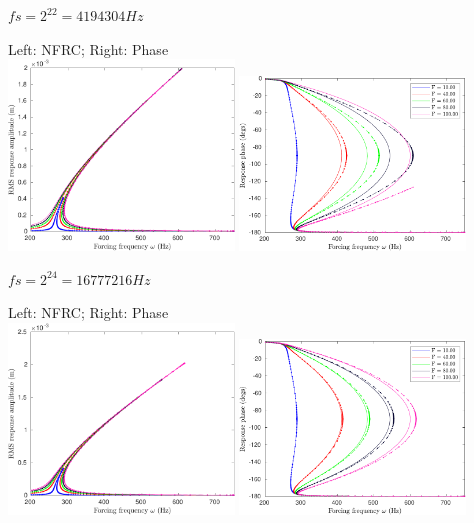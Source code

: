 \documentclass[9pt]{beamer}
\begin{document}
\begin{frame}{$fs=2^{22}=4194304 Hz$}
 \begin{center}
    Left: NFRC; Right: Phase\\
    \includegraphics[width=0.45\textwidth]{fig/nfrc/dssex_frf_Amp_fs4194304}
    \includegraphics[width=0.45\textwidth]{fig/nfrc/dssex_frf_Phase_fs4194304}
  \end{center}
\end{frame}


\begin{frame}{$fs=2^{24}=16777216 Hz$}
 \begin{center}
    Left: NFRC; Right: Phase\\
    \includegraphics[width=0.45\textwidth]{fig/nfrc/dssex_frf_Amp_fs16777216}
    \includegraphics[width=0.45\textwidth]{fig/nfrc/dssex_frf_Phase_fs16777216}
  \end{center}
\end{frame}
\end{document}
